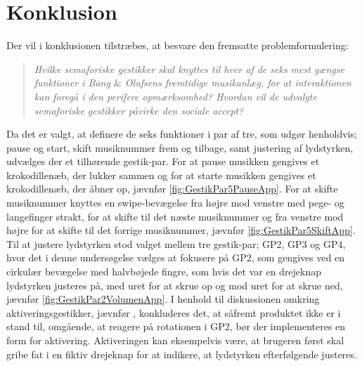 \chapter{Konklusion}
\label{Konklusion}
%
Der vil i konklusionen tilstræbes, at besvare den fremsatte problemformulering: 
%
\begin{quotation}
	\noindent
	\textit{Hvilke semaforiske gestikker skal knyttes til hver af de seks mest gængse funktioner i Bang $\&$ Olufsens fremtidige musikanlæg, for at interaktionen kan foregå i den perifere opmærksomhed?\blankline
		Hvordan vil de udvalgte semaforiske gestikker påvirke den sociale accept?}\blankline
\end{quotation}
%
Da det er valgt, at definere de seks funktioner i par af tre, som udgør henholdvis; pause og start, skift musiknummer frem og tilbage, samt justering af lydstyrken, udvælges der et tilhørende gestik-par. For at pause musikken gengives et krokodillenæb, der lukker sammen og for at starte musikken gengives et krokodillenæb, der åbner op, jævnfør \autoref{fig:GestikPar5PauseApp}. For at skifte musiknummer knyttes en swipe-bevægelse fra højre mod venstre med pege- og langefinger strakt, for at skifte til det næste musiknummer og fra venstre mod højre for at skifte til det forrige musiknummer, jævnfør \autoref{fig:GestikPar5SkiftApp}. Til at justere lydstyrken stod valget mellem tre gestik-par; GP2, GP3 og GP4, hvor det i denne undersøgelse vælges at fokusere på GP2, som gengives ved en cirkulær bevægelse med halvbøjede fingre, som hvis det var en drejeknap lydstyrken justeres på, med uret for at skrue op og mod uret for at skrue ned, jævnfør \autoref{fig:GestikPar2VolumenApp}. I henhold til diskussionen omkring aktiveringsgestikker, jævnfør , konkluderes det, at såfremt produktet ikke er i stand til, omgående, at reagere på rotationen i GP2, bør der implementeres en form for aktivering. Aktiveringen kan eksempelvis være, at brugeren først skal gribe fat i en fiktiv drejeknap for at indikere, at lydstyrken efterfølgende justeres.

